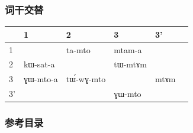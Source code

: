 \documentclass[xcolor=table]{beamer}
\newcommand{\ipa}[1]{{\phon \mbox{#1}}} %
\newcommand{\grise}[1]{\cellcolor{lightgray}\textbf{#1}}
\newcommand{\bleu}[1]{{\color{blue}#1}}
\newcommand{\rouge}[1]{{\color{red}#1}}
\begin{document}
          
 \begin{frame} 
 \frametitle{词干交替}      
     
     \centering
 \begin{tabular}{llllll}
&     1 & 2 & 3 &3'\\
\toprule
 1 &\grise{} &\ipa{ta-mto} & \ipa{\bleu{mtam}-a}\\  
 2 &\ipa{kɯ-sat-a}&\grise{}  &  \ipa{tɯ-\bleu{mtɤm}}\\  
 3 & \ipa{\rouge{ɣɯ}-mto-a}&  \ipa{tɯ́-\rouge{wɣ}-mto}&\grise{}   &\ipa{\bleu{mtɤm}} \\
  3'&  &&  \ipa{\rouge{ɣɯ}-mto}\\
  \bottomrule
\end{tabular}
     
          \end{frame}    
          
   \begin{frame} 
 \frametitle{参考目录}
 \tiny
 

 \end{frame}
\end{document}
